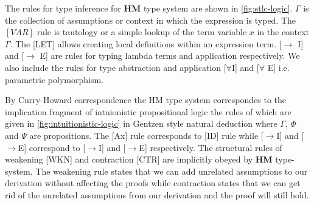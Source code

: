 The rules for type inference for \textbf{HM} type system are shown in \cref{fig:stlc-logic}. $\Gamma$ is the
collection of assumptions or context in which the expression is typed. The $[VAR]$ rule is tautology or a simple
lookup of the term variable $x$ in the context $\Gamma$. The [LET] allows creating local
definitions within an expression term. [$\rightarrow$ I] and [$\rightarrow$ E] are rules
for typing lambda terms and application respectively. We also include the rules for
type abstraction and application [$\forall$I] and [$\forall$ E] i.e. parametric polymorphism.

By Curry-Howard correspondence the HM type system correspondes to the implication fragment of intuionistic propositional logic
the rules of which are given in \cref{fig:intuitionistic-logic} in Gentzen style natural deduction
where $\Gamma$, $\Phi$ and $\Psi$ are propositions. The [Ax] rule corresponds to [ID] rule while [$\rightarrow$I] and [$\rightarrow$E] correspond
to [$\rightarrow$I] and [$\rightarrow$E] respectively. The structural rules of weakening [WKN] and contraction [CTR] are implicitly obeyed
by \textbf{HM} type-system. The weakening rule states that we can add unrelated assumptions to our derivation without
affecting the proofs while contraction states that we can get rid of the unrelated assumptions from our derivation and the
proof will still hold.

